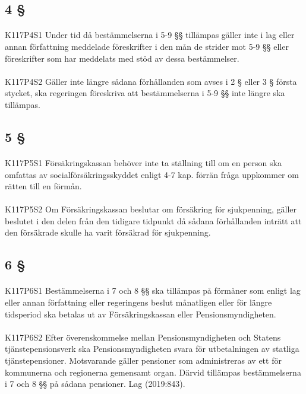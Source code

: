 \documentclass[a4paper,notitlepage,openany,10pt]{book}
\begin{document}
\subsection*{4 §}
\paragraph*{}
{\tiny K117P4S1}
Under tid då bestämmelserna i 5-9 §§ tillämpas gäller inte i lag eller annan författning meddelade föreskrifter i den mån de strider mot 5-9 §§ eller föreskrifter som har meddelats med stöd av dessa bestämmelser.
\paragraph*{}
{\tiny K117P4S2}
Gäller inte längre sådana förhållanden som avses i 2 § eller 3 § första stycket, ska regeringen föreskriva att bestämmelserna i 5-9 §§ inte längre ska tillämpas.
\subsection*{5 §}
\paragraph*{}
{\tiny K117P5S1}
Försäkringskassan behöver inte ta ställning till om en person ska omfattas av socialförsäkringsskyddet enligt 4-7 kap. förrän fråga uppkommer om rätten till en förmån.
\paragraph*{}
{\tiny K117P5S2}
Om Försäkringskassan beslutar om försäkring för sjukpenning, gäller beslutet i den delen från den tidigare tidpunkt då sådana förhållanden inträtt att den försäkrade skulle ha varit försäkrad för sjukpenning.
\subsection*{6 §}
\paragraph*{}
{\tiny K117P6S1}
Bestämmelserna i 7 och 8 §§ ska tillämpas på förmåner som enligt lag eller annan författning eller regeringens beslut månatligen eller för längre tidsperiod ska betalas ut av Försäkringskassan eller Pensionsmyndigheten.
\paragraph*{}
{\tiny K117P6S2}
Efter överenskommelse mellan Pensionsmyndigheten och Statens tjänstepensionsverk ska Pensionsmyndigheten svara för utbetalningen av statliga tjänstepensioner. Motsvarande gäller pensioner som administreras av ett för kommunerna och regionerna gemensamt organ. Därvid tillämpas bestämmelserna i 7 och 8 §§ på sådana pensioner.
Lag (2019:843).
\end{document}
